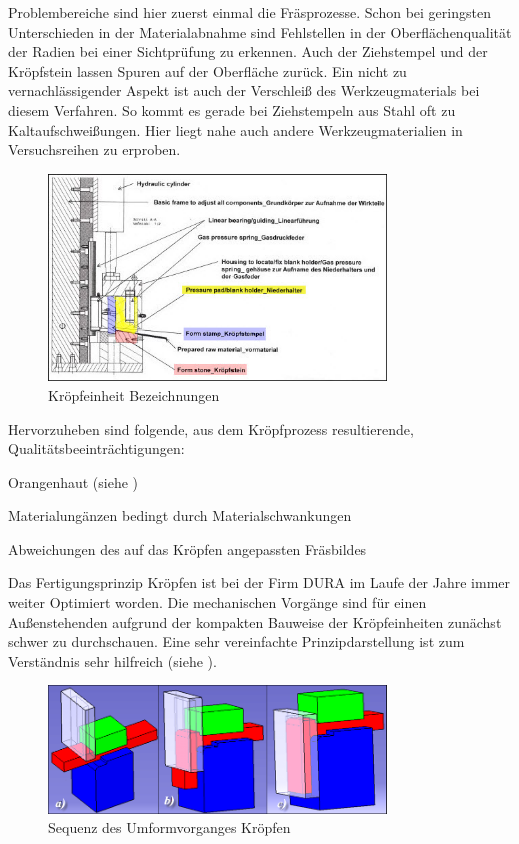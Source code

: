 \documentclass[12pt,a4paper,parskip]{scrartcl}
\begin{document}
 
Problembereiche sind hier zuerst einmal die Fräsprozesse. Schon bei geringsten Unterschieden in der Materialabnahme sind Fehlstellen in der Oberflächenqualität der Radien bei einer Sichtprüfung zu erkennen. Auch der Ziehstempel und der Kröpfstein lassen Spuren auf der Oberfläche zurück. Ein nicht zu vernachlässigender Aspekt ist auch der Verschleiß des Werkzeugmaterials bei diesem Verfahren. So kommt es gerade bei Ziehstempeln aus Stahl oft zu Kaltaufschweißungen. Hier liegt nahe auch andere Werkzeugmaterialien in Versuchsreihen zu erproben.
\begin{figure}[hbtp]
\centering
\includegraphics[width=0.8\textwidth]{kropfeinzeichFarb}
\caption{Kröpfeinheit Bezeichnungen}
\label{krofpfarbbezeich}
\end{figure}





\medskip

Hervorzuheben sind folgende, aus dem Kröpfprozess resultierende, Qualitätsbeeinträchtigungen:
\begin{itemize*}
\item Orangenhaut (siehe )
\item Materialungänzen bedingt durch Materialschwankungen
\item Abweichungen des auf das Kröpfen angepassten Fräsbildes
\end{itemize*}

Das Fertigungsprinzip Kröpfen  ist bei der Firm DURA im  Laufe der Jahre immer weiter Optimiert worden. Die mechanischen Vorgänge sind für einen Außenstehenden aufgrund der kompakten Bauweise der Kröpfeinheiten zunächst schwer zu durchschauen. Eine sehr vereinfachte Prinzipdarstellung ist zum Verständnis sehr hilfreich (siehe ).\\
\begin{figure}[hbtp]
\centering
\includegraphics[width=0.8\textwidth]{krpfsequenz}
\caption{Sequenz des Umformvorganges Kröpfen}
\label{fig:krpfprinz}
\end{figure}
\end{document}
